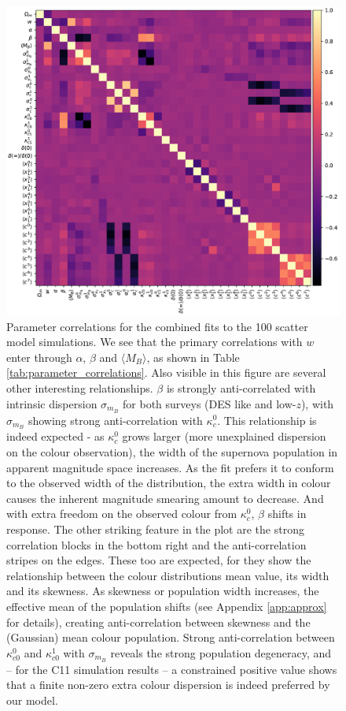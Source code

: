 \documentclass[a4paper,fleqn,usenatbib]{mnras}
\newcommand{\gten}{\citetalias{Guy2010}}
\begin{document}
\begin{figure}
	\begin{center}
		\includegraphics[width=\textwidth]{bulk_cor.pdf}
	\end{center}
	\caption{Parameter correlations for the combined fits to the 100 {\gten} scatter model simulations. We see that the primary correlations with $w$ enter through $\alpha$, $\beta$ and $\langle M_B \rangle$, as shown in Table \ref{tab:parameter_correlations}. Also visible in this figure are several other interesting relationships. $\beta$ is strongly anti-correlated with intrinsic dispersion $\sigma_{m_B}$ for both surveys (DES like and low-$z$), with $\sigma_{m_B}$ showing strong anti-correlation with $\kappa^0_c$. This relationship is indeed expected - as $\kappa^0_c$ grows larger (more unexplained dispersion on the colour observation), the width of the supernova population in apparent magnitude space increases. As the fit prefers it to conform to the observed width of the distribution, the extra width in colour causes the inherent magnitude smearing amount to decrease. And with extra freedom on the observed colour from $\kappa^0_c$, $\beta$ shifts in response. The other striking feature in the plot are the strong correlation blocks in the bottom right and the anti-correlation stripes on the edges. These too are expected, for they show the relationship between the colour distributions mean value, its width and its skewness. As skewness or population width increases, the effective mean of the population shifts (see Appendix \ref{app:approx} for details), creating anti-correlation between skewness and the (Gaussian) mean colour population. Strong anti-correlation between $\kappa_{c0}^0$ and $\kappa_{c0}^1$ with $\sigma_{m_B}$ reveals the strong population degeneracy, and -- for the C11 simulation results -- a constrained positive value shows that a finite non-zero extra colour dispersion is indeed preferred by our model. }
	\label{fig:bulk_cor}
\end{figure}
\end{document}
